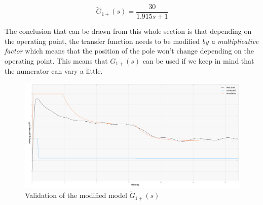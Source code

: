 \begin{equation}
    \tilde{G}_{1+}(s) = \frac{30}{1.915 s + 1}
\end{equation}

The conclusion that can be drawn from this whole section is that depending on the operating point, the transfer function
needs to be modified \textit{by a multiplicative factor} which means that the position of the pole won't change 
depending on the operating point. This means that $G_{1+}(s)$ can be used if we keep in mind that the numerator can
vary a little.

\begin{figure}[H]
    \centering
    \includegraphics[height=\textheight/3]{Pictures/validation_A0_30.png}
    \caption{Validation of the modified model $\tilde{G}_{1+}(s)$}
    \label{validation_A0_30}
\end{figure}
